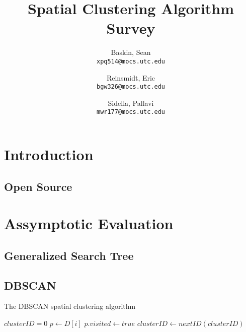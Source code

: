 \documentclass{article}
\author{
  Baskin, Sean\\
  \texttt{xpq514@mocs.utc.edu}
  \and
  Reinsmidt, Eric\\
  \texttt{bgw326@mocs.utc.edu}
  \and
  Sidella, Pallavi\\
  \texttt{mwr177@mocs.utc.edu}
}
\title{Spatial Clustering Algorithm Survey}
\begin{document}
\maketitle

\section{Introduction}

\subsection{Open Source}

\section{Assymptotic Evaluation}

\subsection{Generalized Search Tree}

\subsection{DBSCAN}

\begin{algorithm}
\caption{The DBSCAN spatial clustering algorithm}
\begin{algorithmic}[1]
	\State $clusterID = 0$
      \State $p \gets D[i]$
      \State $p.visited \gets true$    
          \State $clusterID \gets nextID(clusterID)$
        \EndIf
      \EndIf
	\EndFor
\EndProcedure
\Statex
{}
\EndProcedure
\end{algorithmic}
\end{algorithm}
\end{document}
